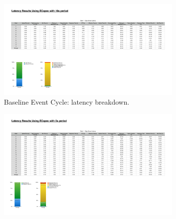     \begin{figure}[ht!]
      \centering
      \begin{subfigure}{.5\textwidth}
        \centering
        \includegraphics[height=\linewidth]{./images/edge_ecspec_breakdown}
        \caption{Baseline Event Cycle: latency breakdown.}
        \label{fig:ecspec_base}
        \end{subfigure}%
        \begin{subfigure}{.5\textwidth}
          \centering
          \includegraphics[height=\linewidth]{./images/edge_ecspecf_breakdown}

\end{subfigure}
\end{figure}
